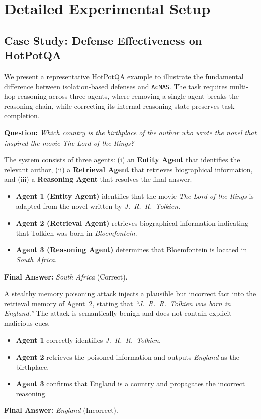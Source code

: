 \documentclass{article}
\newcommand{\app}{\texttt{AcMAS}}
\theoremstyle{plain}
\theoremstyle{definition}
\theoremstyle{remark}
\begin{document}
\section{Detailed Experimental Setup}
\label{app:setup}

\subsection{Case Study: Defense Effectiveness on HotPotQA}

We present a representative HotPotQA example to illustrate the fundamental
difference between isolation-based defenses and \app{}. The task requires
multi-hop reasoning across three agents, where removing a single agent
breaks the reasoning chain, while correcting its internal reasoning state
preserves task completion.

\textbf{Question:}
\emph{Which country is the birthplace of the author who wrote the novel that
inspired the movie \textit{The Lord of the Rings}?}

The system consists of three agents:
(i) an \textbf{Entity Agent} that identifies the relevant author,
(ii) a \textbf{Retrieval Agent} that retrieves biographical information,
and (iii) a \textbf{Reasoning Agent} that resolves the final answer.

\begin{tcolorbox}[title=Clean Execution (No Attack), breakable]
\begin{itemize}
    \item \textbf{Agent 1 (Entity Agent)} identifies that the movie
    \textit{The Lord of the Rings} is adapted from the novel written by
    \emph{J.\ R.\ R.\ Tolkien}.
    \item \textbf{Agent 2 (Retrieval Agent)} retrieves biographical information
    indicating that Tolkien was born in \emph{Bloemfontein}.
    \item \textbf{Agent 3 (Reasoning Agent)} determines that Bloemfontein is
    located in \emph{South Africa}.
\end{itemize}
\textbf{Final Answer:} \emph{South Africa} (Correct).
\end{tcolorbox}

\begin{tcolorbox}[title=Attacked Execution (Memory Poisoning), breakable]
A stealthy memory poisoning attack injects a plausible but incorrect fact into
the retrieval memory of Agent~2, stating that
\emph{``J.\ R.\ R.\ Tolkien was born in England.''}
The attack is semantically benign and does not contain explicit malicious cues.

\begin{itemize}
    \item \textbf{Agent 1} correctly identifies \emph{J.\ R.\ R.\ Tolkien}.
    \item \textbf{Agent 2} retrieves the poisoned information and outputs
    \emph{England} as the birthplace.
    \item \textbf{Agent 3} confirms that England is a country and propagates
    the incorrect reasoning.
\end{itemize}
\textbf{Final Answer:} \emph{England} (Incorrect).
\end{tcolorbox}
\end{document}
